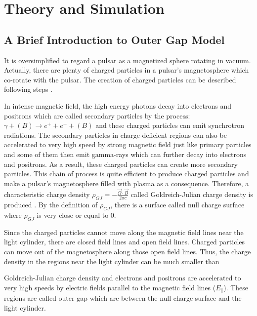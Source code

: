 \documentclass[12pt]{report}
\newcommand{\gj}[0]{
  Goldreich-Julian charge density
}
\begin{document}
    \chapter{Theory and Simulation}
      \section{A Brief Introduction to Outer Gap Model}
        It is oversimplified to regard a pulsar as a magnetized sphere rotating in vacuum. 
        Actually, there are plenty of charged particles in a pulsar's magnetosphere 
        which co-rotate with the pulsar. The creation of charged particles can 
        be described following steps \cite{Sturrock:1971zc}.

        In intense magnetic field, the high energy photons decay into electrons and 
        positrons which are called secondary particles by the process: 
        $\gamma + (B) \rightarrow e^++e^-+(B)$ and these charged particles can emit 
        synchrotron radiations. The secondary particles in charge-deficient regions can also 
        be accelerated to very high speed by strong magnetic field just like primary particles 
        and some of them then emit gamma-rays which can further decay into electrons and 
        positrons. As a result, these charged particles can create more secondary particles.
        This chain of process is quite efficient to produce charged particles and 
        make a pulsar's magnetosphere filled with plasma as a consequence. Therefore, a 
        characteristic charge density $\rho_{GJ}=-\frac{\vec{\Omega}\cdot \vec{B}}{2\pi c}$ 
        called Goldreich-Julian charge density is produced \cite{1969ApJ}. By the definition 
        of $\rho_{GJ}$, there is a surface called null charge surface where $\rho_{GJ}$ is 
        very close or equal to $0$. 

        Since the charged particles cannot move along the magnetic field lines near 
        the light cylinder, there are closed field lines and open field lines. Charged 
        particles can move out of the magnetosphere along those open field lines. Thus, the 
        charge density in the regions near the light cylinder can be much smaller than 
        \gj{} and electrons and positrons are accelerated to very high speeds by electric 
        fields parallel to the magnetic field lines ($E_{\parallel}$). These regions are called 
        outer gap which are between the null charge surface and the light cylinder.
        \cite{1986ApJ...300..500C} 
        
\end{document}
